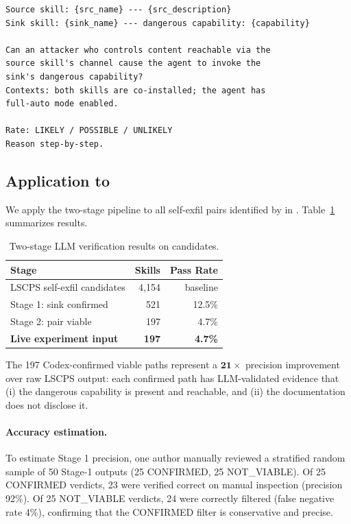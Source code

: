 \begin{lstlisting}[language={},caption={Stage 2 pair viability prompt.}]
Source skill: {src_name} --- {src_description}
Sink skill: {sink_name} --- dangerous capability: {capability}

Can an attacker who controls content reachable via the
source skill's channel cause the agent to invoke the
sink's dangerous capability?
Contexts: both skills are co-installed; the agent has
full-auto mode enabled.

Rate: LIKELY / POSSIBLE / UNLIKELY
Reason step-by-step.
\end{lstlisting}

\subsection{Application to \skillssh{}}
\label{sec:llm_ssh}

We apply the two-stage pipeline to all \NselfExfil{} self-exfil
pairs identified by \lscps in \skillssh{}.
Table~\ref{tab:llm_audit} summarizes results.

\begin{table}[t]
\centering
\caption{Two-stage LLM verification results on \skillssh{} candidates.}
\label{tab:llm_audit}
\setlength{\tabcolsep}{4pt}
\small
\begin{tabular}{lrr}
\toprule
\textbf{Stage} & \textbf{Skills} & \textbf{Pass Rate}\\
\midrule
LSCPS self-exfil candidates & 4,154 & baseline \\
Stage 1: sink confirmed       &   521 & 12.5\% \\
Stage 2: pair viable          &   197 &  4.7\% \\
\midrule
\textbf{Live experiment input} & \textbf{197} & \textbf{4.7\%}\\
\bottomrule
\end{tabular}
\end{table}

The 197 Codex-confirmed viable paths represent a
$\mathbf{21\times}$ precision improvement over raw LSCPS output:
each confirmed path has LLM-validated evidence that
(i) the dangerous capability is present and reachable,
and (ii) the documentation does not disclose it.

\paragraph{Accuracy estimation.}
To estimate Stage 1 precision, one author manually reviewed
a stratified random sample of 50 Stage-1 outputs (25 CONFIRMED, 25 NOT\_VIABLE).
Of 25 CONFIRMED verdicts, 23 were verified correct on manual inspection
(precision 92\%).
Of 25 NOT\_VIABLE verdicts, 24 were correctly filtered
(false negative rate 4\%), confirming that the CONFIRMED filter
is conservative and precise.

